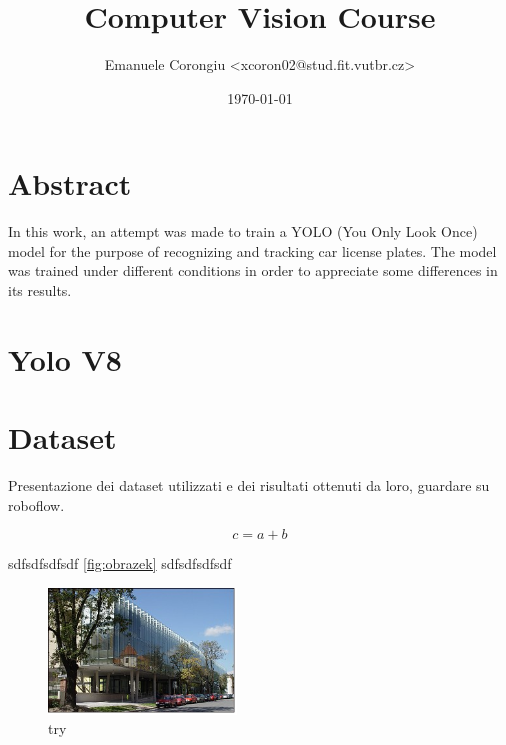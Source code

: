 \documentclass[12pt]{article}
\title{Computer Vision Course}
\author{Emanuele Corongiu <xcoron02@stud.fit.vutbr.cz>}
\date{\today}
\begin{document}


\section{Abstract}
In this work, an attempt was made to train a YOLO (You Only Look Once) model for the purpose of recognizing and tracking car license plates. The model was trained under different conditions in order to appreciate some differences in its results.


\section{Yolo V8}

\section{Dataset}
Presentazione dei dataset utilizzati e dei risultati ottenuti da loro, guardare su roboflow.



\begin{equation}
  \label{moje-rovnice}
  c = a + b
\end{equation}

sdfsdfsdfsdf \ref{fig:obrazek} sdfsdfsdfsdf

\begin{figure}[htb]
  \centering
  \includegraphics[width=5cm,keepaspectratio]{obrazek.jpg}
  \caption{try \cite{wikipedia}}
  \label{fig:try}
\end{figure}






\begin{flushleft}
  
\end{flushleft}

\end{document}
